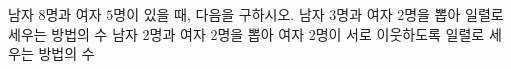 남자 $8$명과 여자 $5$명이 있을 때, 다음을 구하시오.
 남자 $3$명과 여자 $2$명을 뽑아 일렬로 세우는 방법의 수
 남자 $2$명과 여자 $2$명을 뽑아 여자 $2$명이 서로 이웃하도록 일렬로 세우는 방법의 수
